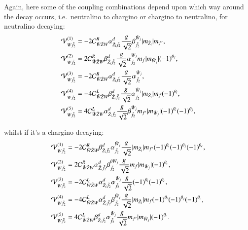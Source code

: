 \documentclass[final,3p,times,pdflatex]{elsarticle}
\begin{document}
Again, here some of the coupling combinations depend upon which way around the decay occurs, i.e.\ neutralino to chargino or chargino to neutralino, for neutralino decaying:
\begin{align}
\mathcal{V}_{W \tilde{f}_2}^{(1)} &= -2 \mathcal{C}_{\tilde{W} \tilde{Z} W}^R \alpha_{\tilde{Z}_i \tilde{f}_2}^{d} {g \over \sqrt{2}} \beta_{\tilde{f}_2}^{\tilde{W}_j}|m_{\tilde{Z}_i}|m_{f'}, \\
\mathcal{V}_{W \tilde{f}_2}^{(2)} &= 2 \mathcal{C}_{\tilde{W} \tilde{Z} W}^R \beta_{\tilde{Z}_i \tilde{f}_2}^{d} {g \over \sqrt{2}} \alpha_{\tilde{f}_2}^{\tilde{W}_j} m_{f} |m_{\tilde{W}_j}|(-1)^{\theta_j}, \\
\mathcal{V}_{W \tilde{f}_2}^{(3)} &= -2 \mathcal{C}_{\tilde{W} \tilde{Z} W}^R  \alpha_{\tilde{Z}_i \tilde{f}_2}^{d} {g \over \sqrt{2}} \alpha_{\tilde{f}_2}^{\tilde{W}_j}, \\
\mathcal{V}_{W \tilde{f}_2}^{(4)} &= -4 \mathcal{C}_{\tilde{W} \tilde{Z} W}^L \beta_{\tilde{Z}_i \tilde{f}_2}^{d} {g \over \sqrt{2}} \alpha_{\tilde{f}_2}^{\tilde{W}_j}|m_{\tilde{Z}_i}|m_{f}(-1)^{\theta_i}, \\
\mathcal{V}_{W \tilde{f}_2}^{(5)} &= 4 \mathcal{C}_{\tilde{W} \tilde{Z} W}^L \alpha_{\tilde{Z}_i \tilde{f}_2}^{d} {g \over \sqrt{2}} \beta_{\tilde{f}_2}^{\tilde{W}_j}m_{f'}|m_{\tilde{W}_j}|(-1)^{\theta_i}(-1)^{\theta_j},
\end{align}

whilst if it's a chargino decaying:
\begin{align}
\mathcal{V}_{W \tilde{f}_2}^{(1)} &= -2 \mathcal{C}_{\tilde{W} \tilde{Z} W}^R \beta_{\tilde{Z}_i \tilde{f}_2}^{d} \alpha_{\tilde{f}_2}^{\tilde{W}_j} {g \over \sqrt{2}} |m_{\tilde{Z}_i}|m_{f'}(-1)^{\theta_i}(-1)^{\theta_j}(-1)^{\theta_c}, \\
\mathcal{V}_{W \tilde{f}_2}^{(2)} &= 2 \mathcal{C}_{\tilde{W} \tilde{Z} W}^R \alpha_{\tilde{Z}_i \tilde{f}_2}^{d} \beta_{\tilde{f}_2}^{\theta{W}_j} {g \over \sqrt{2}} m_{f} |m_{\tilde{W}_j}|(-1)^{\theta_c}, \\
\mathcal{V}_{W \tilde{f}_2}^{(3)} &= -2 \mathcal{C}_{\tilde{W} \tilde{Z} W}^L \alpha_{\tilde{Z}_i \tilde{f}_2}^{d} \alpha_{\tilde{f}_2}^{\tilde{W}_j} {g \over \sqrt{2}} (-1)^{\theta_i} (-1)^{\theta_c}, \\
\mathcal{V}_{W \tilde{f}_2}^{(4)} &= -4 \mathcal{C}_{\tilde{W} \tilde{Z} W}^L \alpha_{\tilde{Z}_i \tilde{f}_2}^{d} \beta_{\tilde{f}_2}^{\tilde{W}_j} {g \over \sqrt{2}} |m_{\tilde{Z}_i}| m_{f} (-1)^{\theta_i}(-1)^{\theta_j}(-1)^{\theta_c}, \\
\mathcal{V}_{W \tilde{f}_2}^{(5)} &= 4 \mathcal{C}_{\tilde{W} \tilde{Z} W}^L \beta_{\tilde{Z}_i \tilde{f}_2}^{d} \alpha_{\tilde{f}_2}^{\tilde{W}_j}{g \over \sqrt{2}} m_{f'}|m_{\tilde{W}_j}| (-1)^{\theta_c}.
\end{align}
\end{document}
